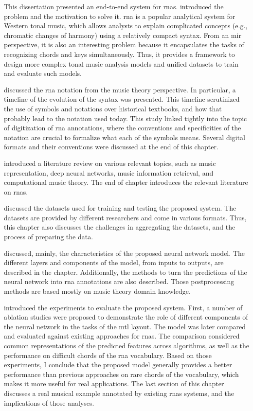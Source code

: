 
This dissertation presented an end-to-end system for
\glspl{rna}.  introduced the problem
and the motivation to solve it. \gls{rna} is a popular
analytical system for Western tonal music, which allows
analysts to explain complicated concepts (e.g., chromatic
changes of harmony) using a relatively compact syntax. From
an \gls{mir} perspective, it is also an interesting problem
because it encapsulates the tasks of recognizing chords and
keys simultaneously. Thus, it provides a framework to design
more complex tonal music analysis models and unified
datasets to train and evaluate such models.

 discussed the
\gls{rna} notation from the music theory perspective. In
particular, a timeline of the evolution of the syntax was
presented. This timeline scrutinized the use of symbols and
notations over historical textbooks, and how that probably
lead to the notation used today. This study linked tightly
into the topic of digitization of \gls{rna} annotations,
where the conventions and specificities of the notation are
crucial to formalize what each of the symbols means. Several
digital formats and their conventions were discussed at the
end of this chapter.

 introduced a literature review on
various relevant topics, such as music representation, deep
neural networks, music information retrieval, and
computational music theory. The end of chapter introduces
the relevant literature on \glspl{rna}.

 discussed the
datasets used for training and testing the proposed system.
The datasets are provided by different researchers and come
in various formats. Thus, this chapter also discusses the
challenges in aggregating the datasets, and the process of
preparing the data.

 discussed, mainly, the characteristics
of the proposed neural network model. The different layers
and components of the model, from inputs to outputs, are
described in the chapter. Additionally, the methods to turn
the predictions of the neural network into \gls{rna}
annotations are also described. Those postprocessing methods
are based mostly on music theory domain knowledge.

 introduced the experiments
to evaluate the proposed system. First, a number of ablation
studies were proposed to demonstrate the role of different
components of the neural network in the tasks of the
\gls{mtl} layout. The model was later compared and evaluated
against existing approaches for \glspl{rna}. The comparison
considered common representations of the predicted features
across algorithms, as well as the performance on difficult
chords of the \gls{rna} vocabulary. Based on those
experiments, I conclude that the proposed model generally
provides a better performance than previous approaches on
rare chords of the vocabulary, which makes it more useful
for real applications. The last section of this chapter
discusses a real musical example annotated by existing
\glspl{rna} systems, and the implications of those analyses.
